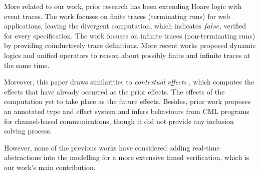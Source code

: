\documentclass[acmsmall,review,anonymous]{acmart}\settopmatter{printfolios=true,printccs=false,printacmref=false}
\newcommand{\code}[1]{{\tt{\ensuremath{\m{#1}}}}}
\newcommand{\m}{\mathit}
\begin{document}
 

 
More related to our work, prior research has been extending Hoare logic with event traces. The work \cite{malecha2011trace} focuses on finite traces (terminating runs) for web applications, leaving the divergent computation, which indicates \code{false}, verified for every specification. The work \cite{nakata2010hoare} focuses on infinite traces (non-terminating runs) by providing coinductively trace definitions. 
More recent works \cite{bubel2015dynamic,song2020automated} proposed dynamic logics and unified operators to reason about possibly finite and infinite traces at the same time. 

Moreover, this paper draws similarities to \textit{contextual effects} \cite{neamtiu2008contextual}, which computes the effects that have already occurred as the prior effects. The effects of the computation yet to take place as the future effects. 
Besides, prior work \cite{nielson1998behaviour} proposes an annotated type and effect system and infers behaviours from CML \cite{reppy1993concurrent} programs for channel-based communications, though it did not provide any inclusion solving process. 



However, none of the previous works have considered adding real-time abstractions into the modelling for a more extensive timed verification, which is our work's main contribution.




 
%
%
%
%
%
 

\end{document}
